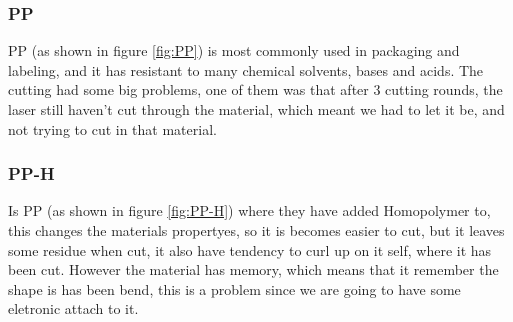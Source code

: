 \subsubsection{PP}
 PP (as shown in figure \ref{fig:PP}) is most commonly used in packaging and labeling, and it has resistant to many chemical solvents, bases and acids.
The cutting had some big problems, one of them was that after 3 cutting rounds, the laser still haven't cut through the material, which meant we had to let it be, and not trying to cut in that material.


\subsubsection{PP-H}
Is PP (as shown in figure \ref{fig:PP-H}) where they have added Homopolymer to, this changes the materials propertyes, so it is becomes easier to cut, but it leaves some residue when cut, it also have tendency to curl up on it self, where it has been cut.
However the material has memory, which means that it remember the shape is has been bend, this is a problem since we are going to have some eletronic attach to it.

